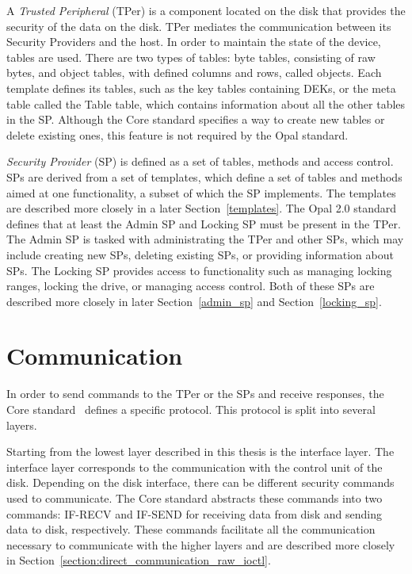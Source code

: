 
A \emph{Trusted Peripheral} (TPer) is a component located on the disk that provides the security of the data on the disk. 
TPer mediates the communication between its Security Providers and the host.
In order to maintain the state of the device, tables are used.
There are two types of tables: byte tables, consisting of raw bytes, and object tables, with defined columns and rows, called objects.
Each template defines its tables, such as the key tables containing DEKs, or the meta table called the Table table, which contains information about all the other tables in the SP.
Although the Core standard specifies a way to create new tables or delete existing ones, this feature is not required by the Opal standard.

\emph{Security Provider} (SP) is defined as a set of tables, methods and access control. SPs are derived from a set of templates, which define a set of tables and methods aimed at one functionality, a subset of which the SP implements. The templates are described more closely in a later Section~\ref{templates}.
The Opal 2.0 standard defines that at least the Admin SP and Locking SP must be present in the TPer. The Admin SP is tasked with administrating the TPer and other SPs, which may include creating new SPs, deleting existing SPs, or providing information about SPs. The Locking SP provides access to functionality such as managing locking ranges, locking the drive, or managing access control. Both of these SPs are described more closely in later Section~\ref{admin_sp} and Section~\ref{locking_sp}.



\section{Communication}
\label{opal_communication}

In order to send commands to the TPer or the SPs and receive responses, the Core standard~\cite{tcg-storage-core} defines a specific protocol.
This protocol is split into several layers.

Starting from the lowest layer described in this thesis is the interface layer. The interface layer corresponds to the communication with the control unit of the disk. Depending on the disk interface, there can be different security commands used to communicate. The Core standard abstracts these commands into two commands: IF-RECV and IF-SEND for receiving data from disk and sending data to disk, respectively. These commands facilitate all the communication necessary to communicate with the higher layers and are described more closely in Section~\ref{section:direct_communication_raw_ioctl}.

